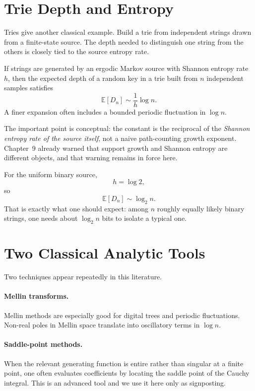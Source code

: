 \section{Trie Depth and Entropy}

Tries give another classical example. Build a trie from independent strings drawn from a finite-state source. The depth needed to distinguish one string from the others is closely tied to the source entropy rate.

\begin{theorem}
If strings are generated by an ergodic Markov source with Shannon entropy rate $h$, then the expected depth of a random key in a trie built from $n$ independent samples satisfies
\[
  \mathbb E[D_n] \sim \frac{1}{h}\log n.
\]
A finer expansion often includes a bounded periodic fluctuation in $\log n$.
\end{theorem}

The important point is conceptual: the constant is the reciprocal of the \emph{Shannon entropy rate of the source itself}, not a naive path-counting growth exponent. Chapter~9 already warned that support growth and Shannon entropy are different objects, and that warning remains in force here.

For the uniform binary source,
\[
  h=\log 2,
\]
so
\[
  \mathbb E[D_n] \sim \log_2 n.
\]
That is exactly what one should expect: among $n$ roughly equally likely binary strings, one needs about $\log_2 n$ bits to isolate a typical one.

\section{Two Classical Analytic Tools}

Two techniques appear repeatedly in this literature.

\paragraph{Mellin transforms.}
Mellin methods are especially good for digital trees and periodic fluctuations. Non-real poles in Mellin space translate into oscillatory terms in $\log n$.

\paragraph{Saddle-point methods.}
When the relevant generating function is entire rather than singular at a finite point, one often evaluates coefficients by locating the saddle point of the Cauchy integral. This is an advanced tool and we use it here only as signposting.

